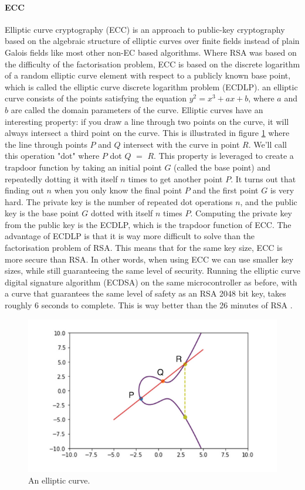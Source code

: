 \documentclass[master=cws,masteroption=vs,english]{kulemt}
\begin{document}
\paragraph{ECC} Elliptic curve cryptography (ECC) is an approach to public-key cryptography based on the algebraic structure of elliptic curves over finite fields instead of plain Galois fields like most other non-EC based algorithms. Where RSA was based on the difficulty of the factorisation problem, ECC  is based on the discrete logarithm of a random elliptic curve element with respect to a publicly known base point, which is called the elliptic curve discrete logarithm problem (ECDLP)\cite{wiki:ECC}. an elliptic curve consists of the points satisfying the equation $ y^2 = x^3 + ax + b$, where $a$ and $b$ are called the domain parameters of the curve. Elliptic curves have an interesting property: if you draw a line through two points on the curve, it will always intersect a third point on the curve. This is illustrated in figure \ref{fig:ECC} where the line through points $P$ and $Q$ intersect with the curve in point $R$. We'll call this operation "dot" where $P$ dot $Q$ $=$ $R$. This property is leveraged to create a trapdoor function by taking an initial point $G$ (called the base point) and repeatedly dotting it with itself $n$ times to get another point $P$. It turns out that finding out $n$ when you only know the final point $P$ and the first point $G$ is very hard. The private key is the number of repeated dot operations $n$, and the public key is the base point $G$ dotted with itself $n$ times $P$. Computing the private key from the public key is the ECDLP, which is the trapdoor function of ECC. The advantage of ECDLP is that it is way more difficult to solve than the factorisation problem of RSA. This means that for the same key size, ECC is more secure than RSA. In other words, when using ECC we can use smaller key sizes, while still guaranteeing the same level of security.  Running the elliptic curve digital signature algorithm (ECDSA) on the same microcontroller as before, with a curve that guarantees the same level of safety as an RSA 2048 bit key, takes roughly 6 seconds to complete. This is way better than the 26 minutes of RSA \cite{Sethi}.

\begin{figure}[h]
	\label{fig:ECC}
	\centering
	\includegraphics[width=\textwidth]{ECC.png}
	\caption{An elliptic curve. \cite{ECCbasics}}
\end{figure} 
\end{document}
